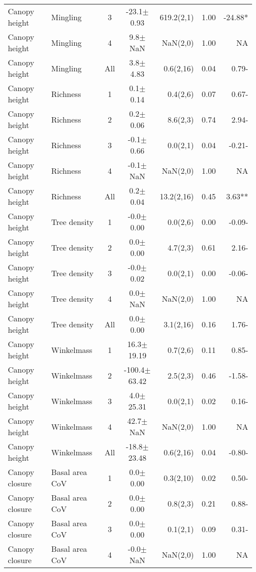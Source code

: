 \begin{longtable}{llcS[table-format=5.1(4.2)]rS[table-format=1.2]r}
  Canopy height & Mingling & 3 & -23.1$\pm$0.93 & 619.2(2,1) & 1.00 & -24.88* \\ 
  Canopy height & Mingling & 4 & 9.8$\pm$NaN & NaN(2,0) & 1.00 & NA \\ 
  Canopy height & Mingling & All & 3.8$\pm$4.83 & 0.6(2,16) & 0.04 & 0.79- \\ 
   \midrule
Canopy height & Richness & 1 & 0.1$\pm$0.14 & 0.4(2,6) & 0.07 & 0.67- \\ 
  Canopy height & Richness & 2 & 0.2$\pm$0.06 & 8.6(2,3) & 0.74 & 2.94- \\ 
  Canopy height & Richness & 3 & -0.1$\pm$0.66 & 0.0(2,1) & 0.04 & -0.21- \\ 
  Canopy height & Richness & 4 & -0.1$\pm$NaN & NaN(2,0) & 1.00 & NA \\ 
  Canopy height & Richness & All & 0.2$\pm$0.04 & 13.2(2,16) & 0.45 & 3.63** \\ 
   \midrule
Canopy height & Tree density & 1 & -0.0$\pm$0.00 & 0.0(2,6) & 0.00 & -0.09- \\ 
  Canopy height & Tree density & 2 & 0.0$\pm$0.00 & 4.7(2,3) & 0.61 & 2.16- \\ 
  Canopy height & Tree density & 3 & -0.0$\pm$0.02 & 0.0(2,1) & 0.00 & -0.06- \\ 
  Canopy height & Tree density & 4 & 0.0$\pm$NaN & NaN(2,0) & 1.00 & NA \\ 
  Canopy height & Tree density & All & 0.0$\pm$0.00 & 3.1(2,16) & 0.16 & 1.76- \\ 
   \midrule
Canopy height & Winkelmass & 1 & 16.3$\pm$19.19 & 0.7(2,6) & 0.11 & 0.85- \\ 
  Canopy height & Winkelmass & 2 & -100.4$\pm$63.42 & 2.5(2,3) & 0.46 & -1.58- \\ 
  Canopy height & Winkelmass & 3 & 4.0$\pm$25.31 & 0.0(2,1) & 0.02 & 0.16- \\ 
  Canopy height & Winkelmass & 4 & 42.7$\pm$NaN & NaN(2,0) & 1.00 & NA \\ 
  Canopy height & Winkelmass & All & -18.8$\pm$23.48 & 0.6(2,16) & 0.04 & -0.80- \\ 
   \midrule
Canopy closure & Basal area CoV & 1 & 0.0$\pm$0.00 & 0.3(2,10) & 0.02 & 0.50- \\ 
  Canopy closure & Basal area CoV & 2 & 0.0$\pm$0.00 & 0.8(2,3) & 0.21 & 0.88- \\ 
  Canopy closure & Basal area CoV & 3 & 0.0$\pm$0.00 & 0.1(2,1) & 0.09 & 0.31- \\ 
  Canopy closure & Basal area CoV & 4 & -0.0$\pm$NaN & NaN(2,0) & 1.00 & NA \\ 

\end{longtable}
